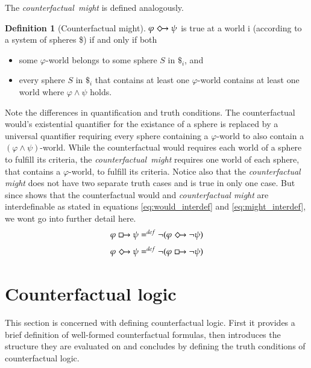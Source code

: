 \documentclass[a4paper,american,10pt]{paper}
\theoremstyle{definition}\newtheorem{definition}{Definition}
\begin{document}
The \textit{counterfactual~might} is defined analogously.

\begin{definition}[Counterfactual might]
	$\varphi\Diamondright\psi$ is true at a world i (according to a system of spheres \$) if and only if both
	\begin{itemize}
	\item[(1)] some $\varphi$-world belongs to some sphere $S$ in $\$_i$, and
	\item[(2)] every sphere $S$ in $\$_i$ that contains at least one $\varphi$-world contains at least one world where $\varphi\wedge\psi$ holds.
	\end{itemize}
	\label{def:counterfactual_might}
\end{definition}

\noindent Note the differences in quantification and truth conditions. The counterfactual would's existential quantifier for the existance of a sphere is replaced by a universal quantifier requiring every sphere containing a $\varphi$-world to also contain a $(\varphi\wedge\psi)$-world. While the counterfactual would requires each world of a sphere to fulfill its criteria, the \textit{counterfactual~might} requires one world of each sphere, that contains a $\varphi$-world, to fulfill its criteria. Notice also that the \textit{counterfactual might} does not have two separate truth cases and is true in only one case. But since \cite{lewis_counterfactuals_1973} shows that the counterfactual would and \textit{counterfactual might} are interdefinable as stated in equations \ref{eq:would_interdef} and \ref{eq:might_interdef}, we wont go into further detail here.
\begin{equation}
\label{eq:would_interdef}
\varphi\boxright\psi =^{def} \neg (\varphi\Diamondright\neg\psi )
\end{equation}
\begin{equation}
\label{eq:might_interdef}
\varphi\Diamondright\psi =^{def} \neg (\varphi\boxright\neg\psi )
\end{equation}
\newpage
\section{Counterfactual logic}\label{sec:cf_logic}
This section is concerned with defining counterfactual logic. First it provides a brief definition of well-formed counterfactual formulas, then introduces the structure they are evaluated on and concludes by defining the truth conditions of counterfactual logic.
\end{document}

